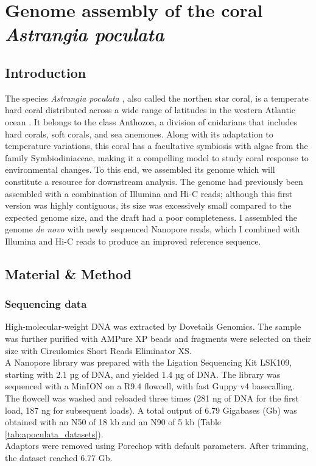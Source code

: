 
\chapter{Genome assembly of the coral \textit{Astrangia poculata}}

\section{Introduction}

The species \textit{Astrangia poculata} \cite{peters1988nomenclature}, also called the northen star coral, is a temperate hard coral distributed across a wide range of latitudes in the western Atlantic ocean \cite{dimond2013simple}. It belongs to the class Anthozoa, a division of cnidarians that includes hard corals, soft corals, and sea anemones. Along with its adaptation to temperature variations, this coral has a facultative symbiosis with algae from the family Symbiodiniaceae, making it a compelling model to study coral response to environmental changes. To this end, we assembled its genome which will constitute a resource for downstream analysis. The genome had previously been assembled with a combination of Illumina and Hi-C reads; although this first version was highly contiguous, its size was excessively small compared to the expected genome size, and the draft had a poor completeness. I assembled the genome \textit{de novo} with newly sequenced Nanopore reads, which I combined with Illumina and Hi-C reads to produce an improved reference sequence. 

\section{Material \& Method}

\subsection{Sequencing data}

High-molecular-weight DNA was extracted by Dovetails Genomics. The sample was further purified with AMPure XP beads and fragments were selected on their size with Circulomics Short Reads Eliminator XS. \\
A Nanopore library was prepared with the Ligation Sequencing Kit LSK109, starting with 2.1 µg of DNA, and yielded 1.4 µg of DNA. The library was sequenced with a MinION on a R9.4 flowcell, with fast Guppy v4 basecalling. The flowcell was washed and reloaded three times (281 ng of DNA for the first load, 187 ng for subsequent loads). A total output of 6.79 Gigabases (Gb) was obtained with an N50 of 18 kb and an N90 of 5 kb (Table \ref{tab:apoculata_datasets}). \\
Adaptors were removed using Porechop \cite{porechop} with default parameters. After trimming, the dataset reached 6.77 Gb. \\


